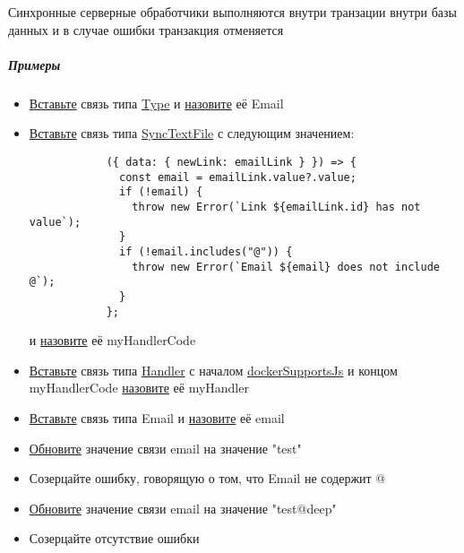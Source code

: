 \documentclass{article}
\begin{document}
Синхронные серверные обработчики выполняются внутри транзации внутри базы
данных и в случае ошибки
транзакция отменяется
\subparagraph{Примеры}
\begin{itemize}
      \item \hyperlink{DeepCase.InsertLink.Description}{Вставьте} связь типа \hyperlink{Core.Type.Description}{Type} и \hyperlink{FAQ.HowToSetName}{назовите} её Email
      \item \hyperlink{DeepCase.InsertLink.Description}{Вставьте} связь типа \hyperlink{Core.SyncTextFile.Description}{SyncTextFile} с следующим значением:
      \begin{lstlisting}
            ({ data: { newLink: emailLink } }) => {
              const email = emailLink.value?.value;
              if (!email) {
                throw new Error(`Link ${emailLink.id} has not value`);
              }
              if (!email.includes("@")) {
                throw new Error(`Email ${email} does not include @`);
              }
            };
            \end{lstlisting}
            и \hyperlink{FAQ.HowToSetName}{назовите} её myHandlerCode
      \item \hyperlink{DeepCase.InsertLink.Description}{Вставьте} связь типа \hyperlink{Core.Handler.Description}{Handler} с началом \hyperlink{Core.dockerSupportsJs.Description}{dockerSupportsJs} и концом myHandlerCode \hyperlink{FAQ.HowToSetName}{назовите} её myHandler
      \item \hyperlink{DeepCase.InsertLink.Description}{Вставьте} связь типа Email и \hyperlink{FAQ.HowToSetName}{назовите} её email
      \item \hyperlink{DeepCase.UpdateLink.Description}{Обновите} значение связи email на значение "test"
      \item Созерцайте ошибку, говорящую о том, что Email не содержит @
      \item \hyperlink{DeepCase.UpdateLink.Description}{Обновите} значение связи email на значение "test@deep"
      \item Созерцайте отсутствие ошибки
\end{itemize}
\end{document}
